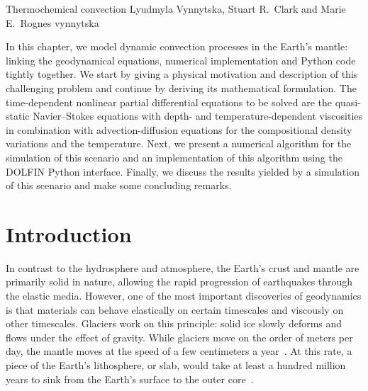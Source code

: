               {Thermochemical convection}
              {Lyudmyla Vynnytska,  Stuart R.~Clark and Marie E.~Rognes}
              {vynnytska}

\newcommand{\erf}{\mathrm{erf}}
\newcommand{\expc}{\mathrm{expc}}
\newcommand{\composition}{\phi}
\newcommand{\test}{\psi}
\newcommand{\triang}{\mathcal{T}}
\newcommand{\jump}[1]{[[#1]]}
\newcommand{\avg}[1]{\{#1\}}
\newcommand{\code}[1]{$\texttt{#1}$}

In this chapter, we model dynamic convection processes in the Earth's
mantle: linking the geodynamical equations, numerical implementation
and Python code tightly together. We start by giving a physical
motivation and description of this challenging problem and continue by
deriving its mathematical formulation. The time-dependent nonlinear
partial differential equations to be solved are the quasi-static
Navier--Stokes equations with depth- and temperature-dependent
viscosities in combination with advection-diffusion equations for the
compositional density variations and the temperature. Next, we present
a numerical algorithm for the simulation of this scenario and an
implementation of this algorithm using the DOLFIN Python
interface. Finally, we discuss the results yielded by a simulation of
this scenario and make some concluding remarks.


\section{Introduction}

In contrast to the hydrosphere and atmosphere, the Earth's crust and
mantle are primarily solid in nature, allowing the rapid progression
of earthquakes through the elastic media.  However, one of the most
important discoveries of geodynamics is that materials can behave
elastically on certain timescales and viscously on other
timescales. Glaciers work on this principle: solid ice slowly deforms
and flows under the effect of gravity.  While glaciers move on the
order of meters per day, the mantle moves at the speed of a few
centimeters a year~\citep{vanderMeer2010}.  At this rate, a piece of
the Earth's lithosphere, or slab, would take at least a hundred
million years to sink from the Earth's surface to the outer
core~\citep{Jarvis2007}.

